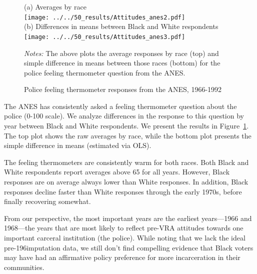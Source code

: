 \documentclass[12pt]{article}
\begin{document}
 \begin{figure}[h!]
   	\begin{center}
   	\caption{Police feeling thermometer responses from the ANES, 1966-1992}
   		\small \vspace*{.05in}
   		\smallskip
			(a) Averages by race \\
   			\texttt{[image: ../../50\_results/Attitudes\_anes2.pdf]} \\
				(b) Differences in means between Black and White respondents \\
   			\texttt{[image: ../../50\_results/Attitudes\_anes3.pdf]}\\
   		\label{figure_anes}
   		\end{center}
  	\scriptsize{\emph{Notes:} The above plots the average responses by race (top) and simple difference in means between those races (bottom) for the police feeling thermometer question from the ANES.}
   \end{figure} \normalsize



The ANES has consistently asked a feeling thermometer question about the police (0-100 scale).
We analyze differences in the response to this question by year between Black and White respondents.  We present the results in Figure~\ref{figure_anes}.  The top plot shows the raw averages by race, while the bottom plot presents the simple difference in means (estimated via OLS).

The feeling thermometers are consistently warm for both races.  Both Black and White respondents report averages above 65 for all years.  However, Black responses are on average always lower than White responses.  In addition, Black responses decline faster than White responses through the early 1970s, before finally recovering somewhat.

From our perspective, the most important years are the earliest years---1966 and 1968---the years that are most likely to reflect pre-VRA attitudes towards one important carceral institution (the police).  While noting that we lack the ideal pre-196imputation data, we still don't find compelling evidence that Black voters may have had an affirmative policy preference for more incarceration in their communities.







\end{document}
